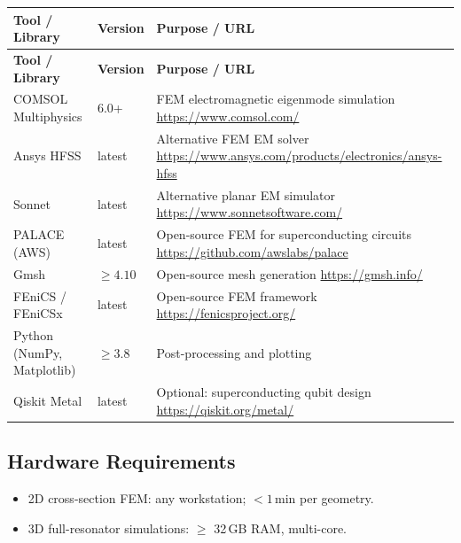 \documentclass[11pt,a4paper]{article}
\begin{document}
\begin{longtable}{p{4.5cm} p{2.5cm} p{6.5cm}}
\toprule
\textbf{Tool / Library} & \textbf{Version} & \textbf{Purpose / URL} \\
\midrule
\endfirsthead
\toprule
\textbf{Tool / Library} & \textbf{Version} & \textbf{Purpose / URL} \\
\midrule
\endhead
COMSOL Multiphysics & 6.0+ & FEM electromagnetic eigenmode simulation \newline \url{https://www.comsol.com/} \\
\midrule
Ansys HFSS & latest & Alternative FEM EM solver \newline \url{https://www.ansys.com/products/electronics/ansys-hfss} \\
\midrule
Sonnet & latest & Alternative planar EM simulator \newline \url{https://www.sonnetsoftware.com/} \\
\midrule
PALACE (AWS) & latest & Open-source FEM for superconducting circuits \newline \url{https://github.com/awslabs/palace} \\
\midrule
Gmsh & $\geq 4.10$ & Open-source mesh generation \newline \url{https://gmsh.info/} \\
\midrule
FEniCS / FEniCSx & latest & Open-source FEM framework \newline \url{https://fenicsproject.org/} \\
\midrule
Python (NumPy, Matplotlib) & $\geq 3.8$ & Post-processing and plotting \\
\midrule
Qiskit Metal & latest & Optional: superconducting qubit design \newline \url{https://qiskit.org/metal/} \\
\bottomrule
\end{longtable}

\subsection{Hardware Requirements}
\begin{itemize}
  \item 2D cross-section FEM: any workstation; $< 1$\,min per geometry.
  \item 3D full-resonator simulations: $\geq$ 32\,GB RAM, multi-core.
\end{itemize}
\end{document}
